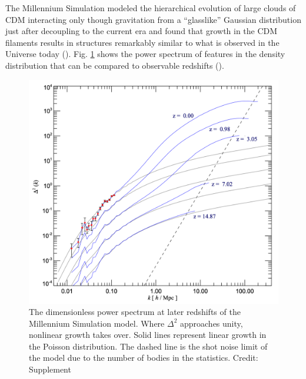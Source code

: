 \documentclass{paper}
\begin{document}
  The Millennium Simulation modeled the hierarchical evolution of large clouds 
  of CDM 
  interacting only though gravitation from a ``glasslike'' Gaussian 
  distribution just after decoupling to the current era and found that
  growth in the CDM filaments results in structures remarkably 
  similar to what is observed in the Universe today
  (\cite{desjacques2018large}). Fig. \ref{fig:Struct-power_spectrum} shows the 
  power spectrum of features in the density distribution that can be compared
  to observable redshifts
  (\cite{2005Natur.435..629S}). 

  \begin{figure}[H]
    \begin{centering}
    \includegraphics[scale=0.5]{Struct-power_spectrum.pdf}
    \caption{The dimensionless power spectrum at later redshifts of the
      Millennium Simulation model. Where \(\Delta^2\) approaches unity, 
      nonlinear growth takes over. Solid lines represent linear growth in the 
      Poisson distribution. The dashed line is the shot noise limit of the 
      model due to the number of bodies in the statistics.
    Credit: \cite{2005Natur.435..629S} Supplement}
    \label{fig:Struct-power_spectrum}
    \end{centering}
  \end{figure}

\end{document}

